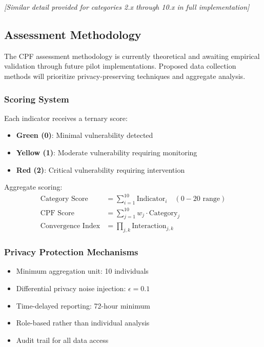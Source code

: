 \documentclass[11pt,a4paper]{article}
\begin{document}
\textit{[Similar detail provided for categories 2.x through 10.x in full implementation]}

\subsection{Assessment Methodology}

The CPF assessment methodology is currently theoretical and awaiting empirical validation through future pilot implementations. Proposed data collection methods will prioritize privacy-preserving techniques and aggregate analysis.

\subsubsection{Scoring System}

Each indicator receives a ternary score:
\begin{itemize}
\item \textbf{Green (0)}: Minimal vulnerability detected
\item \textbf{Yellow (1)}: Moderate vulnerability requiring monitoring
\item \textbf{Red (2)}: Critical vulnerability requiring intervention
\end{itemize}

Aggregate scoring:
\begin{align}
\text{Category Score} &= \sum_{i=1}^{10} \text{Indicator}_i \quad (0-20 \text{ range}) \\
\text{CPF Score} &= \sum_{j=1}^{10} w_j \cdot \text{Category}_j \\
\text{Convergence Index} &= \prod_{j,k} \text{Interaction}_{j,k}
\end{align}

\subsubsection{Privacy Protection Mechanisms}
\begin{itemize}
\item Minimum aggregation unit: 10 individuals
\item Differential privacy noise injection: $\epsilon = 0.1$
\item Time-delayed reporting: 72-hour minimum
\item Role-based rather than individual analysis
\item Audit trail for all data access
\end{itemize}
\end{document}
